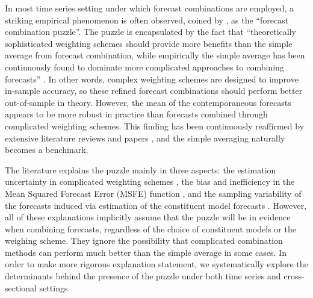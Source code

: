 \documentclass{monashthesis}
\begin{document}
In most time series setting under which forecast combinations are employed, a striking empirical phenomenon is often observed, coined by \textcite{SW04}, as the ``forecast combination puzzle''. The puzzle is encapsulated by the fact that ``theoretically sophisticated weighting schemes should provide more benefits than the simple average from forecast combination, while empirically the simple average has been continuously found to dominate more complicated approaches to combining forecasts'' \autocite{WHLK22}. In other words, complex weighting schemes are designed to improve in-sample accuracy, so these refined forecast combinations should perform better out-of-sample in theory. However, the mean of the contemporaneous forecasts appears to be more robust in practice than forecasts combined through complicated weighting schemes. This finding has been continuously reaffirmed by extensive literature reviews and papers \autocites[e.g.,][]{MACF82,C89,MSA18,MSA20}, and the simple averaging naturally becomes a benchmark.

The literature explains the puzzle mainly in three aspects: the estimation uncertainty in complicated weighting schemes \autocite{SW98,SW04,SW09}, the bias and inefficiency in the Mean Squared Forecast Error (MSFE) function \autocite{E11,CMVW16}, and the sampling variability of the forecasts induced via estimation of the constituent model forecasts \autocite{ZMFP22,FZMP23}. However, all of these explanations implicitly assume that the puzzle will be in evidence when combining forecasts, regardless of the choice of constituent models or the weighing scheme. They ignore the possibility that complicated combination methods can perform much better than the simple average in some cases. In order to make more rigorous explanation statement, we systematically explore the determinants behind the presence of the puzzle under both time series and cross-sectional settings.
\end{document}
